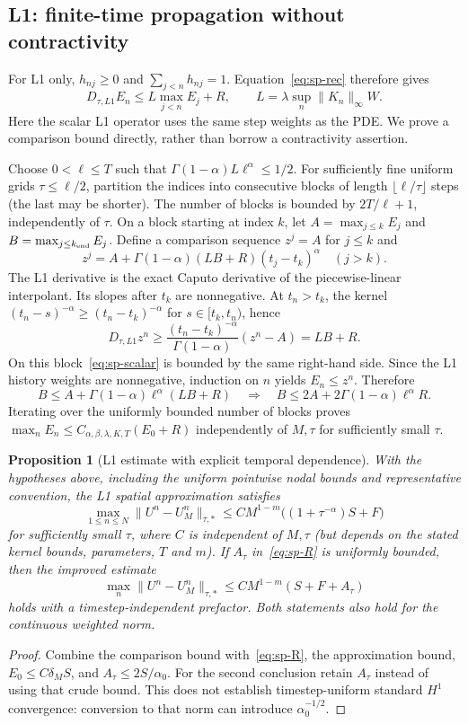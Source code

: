 \documentclass[11pt,a4paper]{amsart}
\theoremstyle{remark}
\theoremstyle{plain}
\newtheorem{proposition}{Proposition}[section]
\theoremstyle{remark}
\numberwithin{equation}{section}
\begin{document}
\subsection{L1: finite-time propagation without contractivity}
For L1 only, $h_{nj}\ge0$ and $\sum_{j<n}h_{nj}=1$. Equation~\eqref{eq:sp-rec} therefore gives
\begin{equation}\label{eq:sp-scalar}
 D_{\tau,L1}E_n\le L\max_{j<n}E_j+R,\qquad L=\lambda\sup_n\|K_n\|_\infty W.
\end{equation}
Here the scalar L1 operator uses the same step weights as the PDE. We prove a comparison bound directly, rather than borrow a contractivity assertion.

Choose $0<\ell\le T$ such that $\Gamma(1-\alpha)L\ell^\alpha\le1/2$. For sufficiently fine uniform grids $\tau\le\ell/2$, partition the indices into consecutive blocks of length $\lfloor\ell/\tau\rfloor$ steps (the last may be shorter). The number of blocks is bounded by $2T/\ell+1$, independently of $\tau$. On a block starting at index $k$, let $A=\max_{j\le k}E_j$ and $B=\max_{j\le k_{\rm end}}E_j$. Define a comparison sequence $z^j=A$ for $j\le k$ and
\[
 z^j=A+\Gamma(1-\alpha)(LB+R)(t_j-t_k)^\alpha\quad(j>k).
\]
The L1 derivative is the exact Caputo derivative of the piecewise-linear interpolant. Its slopes after $t_k$ are nonnegative. At $t_n>t_k$, the kernel $(t_n-s)^{-\alpha}\ge(t_n-t_k)^{-\alpha}$ for $s\in[t_k,t_n)$, hence
\[
 D_{\tau,L1}z^n\ge\frac{(t_n-t_k)^{-\alpha}}{\Gamma(1-\alpha)}(z^n-A)=LB+R.
\]
On this block~\eqref{eq:sp-scalar} is bounded by the same right-hand side. Since the L1 history weights are nonnegative, induction on $n$ yields $E_n\le z^n$. Therefore
\[
 B\le A+\Gamma(1-\alpha)\ell^\alpha(LB+R)
 \quad\Longrightarrow\quad B\le2A+2\Gamma(1-\alpha)\ell^\alpha R.
\]
Iterating over the uniformly bounded number of blocks proves $\max_nE_n\le C_{\alpha,\beta,\lambda,K,T}(E_0+R)$ independently of $M,\tau$ for sufficiently small $\tau$.

\begin{proposition}[L1 estimate with explicit temporal dependence]\label{prop:sp-l1}
With the hypotheses above, including the uniform pointwise nodal bounds and representative convention, the L1 spatial approximation satisfies
\[
 \max_{1\le n\le N}\|U^n-U_M^n\|_{\tau,*}
 \le C M^{1-m}\bigl((1+\tau^{-\alpha})S+F\bigr)
\]
for sufficiently small $\tau$, where $C$ is independent of $M,\tau$ (but depends on the stated kernel bounds, parameters, $T$ and $m$). If $A_\tau$ in~\eqref{eq:sp-R} is uniformly bounded, then the improved estimate
\[
 \max_n\|U^n-U_M^n\|_{\tau,*}\le CM^{1-m}(S+F+A_\tau)
\]
holds with a timestep-independent prefactor. Both statements also hold for the continuous weighted norm.
\end{proposition}
\begin{proof}
Combine the comparison bound with~\eqref{eq:sp-R}, the approximation bound, $E_0\le C\delta_M S$, and $A_\tau\le2S/\alpha_0$. For the second conclusion retain $A_\tau$ instead of using that crude bound. This does not establish timestep-uniform standard $H^1$ convergence: conversion to that norm can introduce $\alpha_0^{-1/2}$.
\end{proof}
\end{document}
